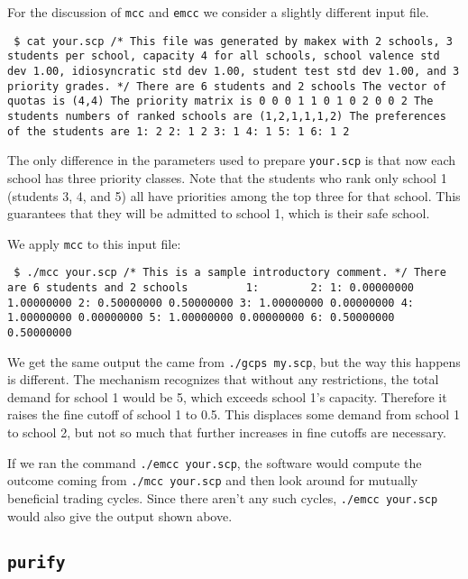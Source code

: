 \documentclass[12pt]{article}
\theoremstyle{definition}
\begin{document}
For the discussion of \texttt{mcc} and \texttt{emcc} we consider a
slightly different input file.
\begin{obeylines}\texttt{
    \$ cat your.scp
/* This file was generated by makex with 2 schools,
3 students per school, capacity 4 for all schools,
school valence std dev 1.00, idiosyncratic std dev 1.00,
student test std dev 1.00, and 3 priority grades. */
There are 6 students and 2 schools
The vector of quotas is (4,4)
The priority matrix is
    0    0
    0    1
    1    0
    1    0
    2    0
    0    2
The students numbers of ranked schools are
(1,2,1,1,1,2)
The preferences of the students are
1:    2
2:    1   2
3:    1
4:    1
5:    1
6:    1   2
  }
\end{obeylines}
The only difference in the parameters used to prepare
\texttt{your.scp} is that now each school has three priority classes.
Note that the students who rank only school 1 (students 3, 4, and 5)
all have priorities among the top three for that school.  This
guarantees that they will be admitted to school 1, which is their safe
school.

We apply \texttt{mcc} to this input file:
\medskip
\begin{obeylines}\texttt{
    \$ ./mcc your.scp 
/* This is a sample introductory comment. */
There are 6 students and 2 schools
 \ \ \ \ \ \ \ \          1: \ \ \ \ \ \ \          2:
1:   0.00000000  1.00000000
2:   0.50000000  0.50000000
3:   1.00000000  0.00000000
4:   1.00000000  0.00000000
5:   1.00000000  0.00000000
6:   0.50000000  0.50000000
}
\end{obeylines} \noindent
We get the same output the came from \texttt{./gcps my.scp}, but the
way this happens is different.  The mechanism recognizes that without
any restrictions, the total demand for school 1 would be 5, which
exceeds school 1's capacity. Therefore it raises the fine cutoff of
school 1 to 0.5.  This displaces some demand from school 1 to school
2, but not so much that further increases in fine cutoffs are
necessary.

If we ran the command \texttt{./emcc your.scp}, the software would
compute the outcome coming from \texttt{./mcc your.scp} and then look
around for mutually beneficial trading cycles.  Since there aren't any
such cycles, \texttt{./emcc your.scp} would also give the output shown
above.

\subsection{\texttt{purify}} \label{subsec:Implementation} 
\end{document}
